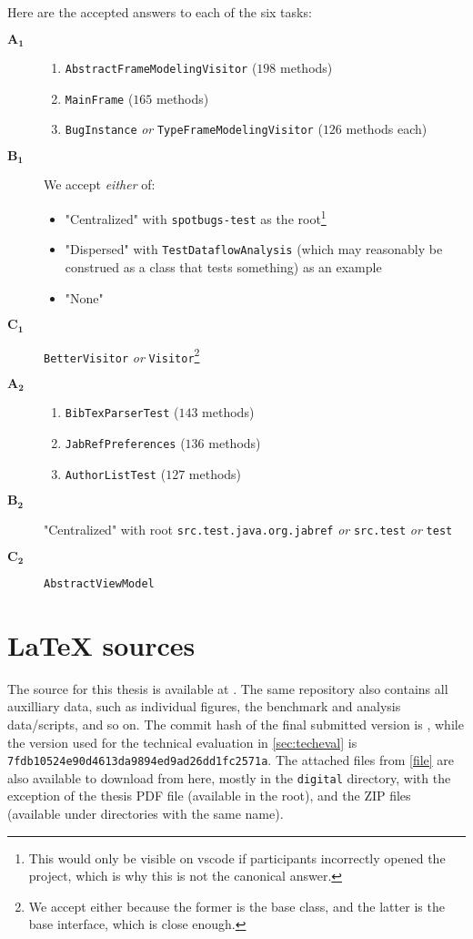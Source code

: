 Here are the accepted answers to each of the six tasks:
\begin{description}
	\item[$\bm{A_1}$]
	      \begin{enumerate}
		      \item \texttt{AbstractFrameModelingVisitor} ($198$ methods)
		      \item \texttt{MainFrame} ($165$ methods)
		      \item \texttt{BugInstance} \emph{or} \texttt{TypeFrameModelingVisitor} ($126$ methods each)
	      \end{enumerate}
	\item[$\bm{B_1}$] We accept \emph{either} of:
	      \begin{itemize}
		      \item "Centralized" with \texttt{spotbugs-test} as the root\footnote{
			            This would only be visible on \gls{vscode} if participants incorrectly opened the project, which is why this is not the canonical answer.
		            }
		      \item "Dispersed" with \texttt{TestDataflowAnalysis} (which may reasonably be construed as a class that tests something) as an example
		      \item "None"
	      \end{itemize}
	\item[$\bm{C_1}$] \texttt{BetterVisitor} \emph{or} \texttt{Visitor}\footnote{
		      We accept either because the former is the base class, and the latter is the base interface, which is close enough.
	      }
	\item[$\bm{A_2}$]
	      \begin{enumerate}
		      \item \texttt{BibTexParserTest} ($143$ methods)
		      \item \texttt{JabRefPreferences} ($136$ methods)
		      \item \texttt{AuthorListTest} ($127$ methods)
	      \end{enumerate}
	\item[$\bm{B_2}$] "Centralized" with root \texttt{src.test.java.org.jabref} \emph{or} \texttt{src.test} \emph{or} \texttt{test}
	\item[$\bm{C_2}$] \texttt{AbstractViewModel}
\end{description}

\section{\LaTeX{} sources}\label{app:source}
The source for this thesis is available at .
The same repository also contains all auxilliary data, such as individual figures, the benchmark and analysis data/scripts, and so on.
The commit hash of the final submitted version is , while the version used for the technical evaluation in \cref{sec:techeval} is \texttt{7fdb10524e90d4613da9894ed9ad26dd1fc2571a}.
The attached files from \cref{file} are also available to download from here, mostly in the \texttt{digital} directory, with the exception of the thesis PDF file (available in the root), and the ZIP files (available under directories with the same name).
